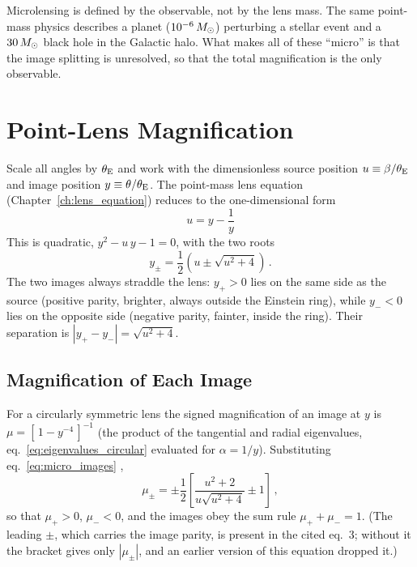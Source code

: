 \begin{remark}
Microlensing is defined by the observable, not by the lens mass.  The
same point-mass physics describes a planet ($10^{-6}\,M_{\odot}$) perturbing a
stellar event and a $30\,M_{\odot}$ black hole in the Galactic halo.  What makes
all of these ``micro'' is that the image splitting is unresolved, so that the
total magnification is the only observable.
\end{remark}


\section{Point-Lens Magnification}
\label{sec:point_lens_mag}

Scale all angles by $\theta_{\mathrm{E}}$ and work with the dimensionless source position
$u \equiv \beta/\theta_{\mathrm{E}}$ and image position $y \equiv \theta/\theta_{\mathrm{E}}$.  The
point-mass lens equation (Chapter~\ref{ch:lens_equation}) reduces to the
one-dimensional form
\citep[eq.~1]{schneider_kochanek_wambsganss_2006}
\begin{equation}
    \boxed{\;u = y - \frac{1}{y}\;}
    \label{eq:micro_lens_eq}
\end{equation}
This is quadratic, $y^2 - u\,y - 1 = 0$, with the two roots
\begin{equation}
    y_\pm = \frac{1}{2}\left(u \pm \sqrt{u^2 + 4}\right) \,.
    \label{eq:micro_images}
\end{equation}
The two images always straddle the lens: $y_+ > 0$ lies on the same side as
the source (positive parity, brighter, always outside the Einstein ring),
while $y_- < 0$ lies on the opposite side (negative parity, fainter, inside
the ring).  Their separation is $|y_+ - y_-| = \sqrt{u^2 + 4}$.

\subsection{Magnification of Each Image}

For a circularly symmetric lens the signed magnification of an image at $y$ is
$\mu = [\,1 - y^{-4}\,]^{-1}$ (the product of the tangential and radial
eigenvalues, eq.~\ref{eq:eigenvalues_circular} evaluated for
$\alpha = 1/y$).  Substituting eq.~\eqref{eq:micro_images}
\citep[eq.~3]{schneider_kochanek_wambsganss_2006},
\begin{equation}
    \mu_\pm = \pm\frac{1}{2}\left[\frac{u^2 + 2}{u\sqrt{u^2 + 4}} \pm 1\right] \,,
    \label{eq:micro_mu_pm}
\end{equation}
so that $\mu_+ > 0$, $\mu_- < 0$, and the images obey the sum rule
$\mu_+ + \mu_- = 1$.  (The leading $\pm$, which carries the image parity, is
present in the cited eq.~3; without it the bracket gives only $|\mu_\pm|$,
and an earlier version of this equation dropped it.)


